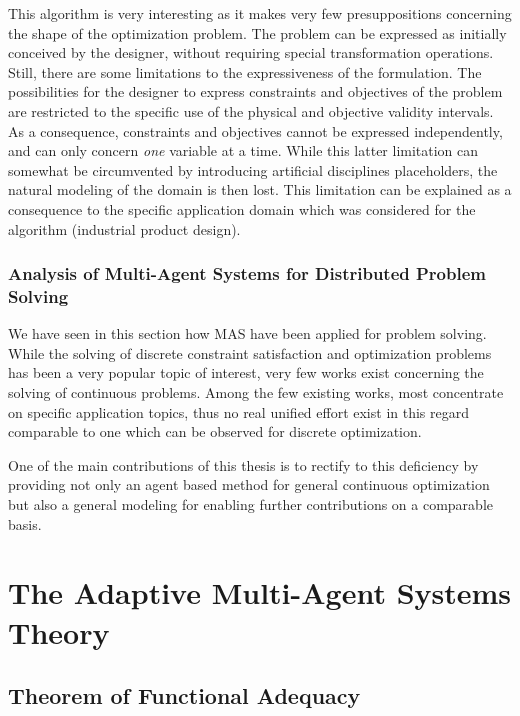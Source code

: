This algorithm is very interesting as it makes very few presuppositions concerning the shape of the optimization problem. The problem can be expressed as initially conceived by the designer, without requiring special transformation operations. Still, there are some limitations to the expressiveness of the formulation. The possibilities for the designer to express constraints and objectives of the problem are restricted to the specific use of the physical and objective validity intervals. As a consequence, constraints and objectives cannot be expressed independently, and can only concern \emph{one} variable at a time. While this latter limitation can somewhat be circumvented by introducing artificial disciplines placeholders, the natural modeling of the domain is then lost. This limitation can be explained as a consequence to the specific application domain which was considered for the algorithm (industrial product design).

\subsubsection{Analysis of Multi-Agent Systems for Distributed Problem Solving}

We have seen in this section how MAS have been applied for problem solving. While the solving of discrete constraint satisfaction and optimization problems has been a very popular topic of interest, very few works exist concerning the solving of continuous problems. Among the few existing works, most concentrate on specific application topics, thus no real unified effort exist in this regard comparable to one which can be observed for discrete optimization.

One of the main contributions of this thesis is to rectify to this deficiency by providing not only an agent based method for general continuous optimization but also a general modeling for enabling further contributions on a comparable basis.

\section{The Adaptive Multi-Agent Systems Theory}\label{amas_theory}

\subsection{Theorem of Functional Adequacy}

